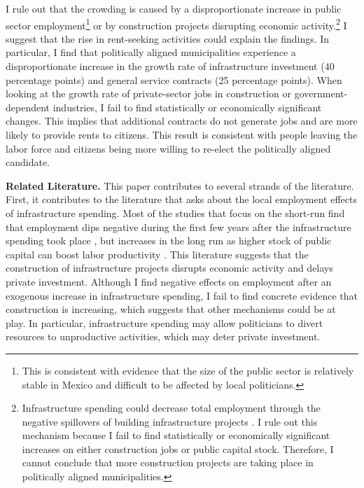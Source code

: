 \documentclass[dv_diss_main.tex]{subfiles}
\begin{document}
I rule out that the crowding is caused by a disproportionate increase in public sector employment\footnote{ This is consistent with evidence that the size of the public sector is relatively stable in Mexico and difficult to be affected by local politicians.} or by construction projects disrupting economic activity.\footnote{ 
Infrastructure spending could decrease total employment through the negative spillovers of building infrastructure projects \cite{ramey2020macroeconomic}. I rule out this mechanism because I fail to find statistically or economically significant increases on either construction jobs or public capital stock. Therefore, I cannot conclude that more construction projects are taking place in politically aligned municipalities.
} 
I suggest that the rise in rent-seeking activities could explain the findings. In particular, I find that politically aligned municipalities experience a disproportionate increase in the growth rate of infrastructure investment (40 percentage points) and general service contracts (25 percentage points). When looking at the growth rate of private-sector jobs in construction or government-dependent industries, I fail to find statistically or economically significant changes. This implies that additional contracts do not generate jobs and are more likely to provide rents to citizens. This result is consistent with people leaving the labor force and citizens being more willing to re-elect the politically aligned candidate. 

\vspace{2mm}
\textbf{Related Literature.} This paper contributes to several strands of the literature. 
First, it contributes to the literature that asks about the local employment effects of infrastructure spending. 
Most of the studies that focus on the short-run find that employment dips negative during the first few years after the infrastructure spending took place \citep{garin2019putting,leduc2013roads,dupor2017so,buchheim2017employment}, but increases in the long run as higher stock of public capital can boost labor productivity
\citep{kline2014local, yaffe2020essays,leduc2013roads,allen2019welfare}.
This literature suggests that the construction of infrastructure projects disrupts economic activity and delays private investment. Although I find negative effects on employment after an exogenous increase in infrastructure spending, I fail to find concrete evidence that construction is increasing, which suggests that other mechanisms could be at play. In particular, infrastructure spending may allow politicians to divert resources to unproductive activities, which may deter private investment. 
\end{document}
